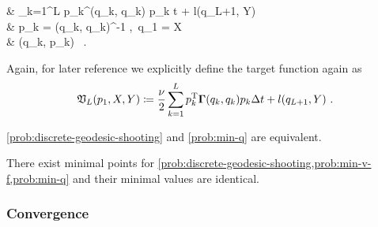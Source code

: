 \begin{problem}
\label{prob:discrete-geodesic-shooting}
	\begin{cases}
		 &  \sum_{k=1}^L p_k^\T \bGamma(q_k, q_k) p_k \Delta t + l(q_{L+1}, Y)\\
		 & p_k = \bGamma(q_k, q_k)^{-1} ,\ q_1 = X \\
		& (q_k, p_k) \ .
	\end{cases}
\end{problem}
Again, for later reference we explicitly define the target function again as
\begin{equation}
	\mathfrak{V}_L(p_1, X, Y) \coloneqq \frac{\nu}{2} \sum_{k=1}^L p_k^{\mathrm{T}} \mathbf{\Gamma}(q_k, q_k) p_k \Delta t + l(q_{L+1}, Y) \ .
\end{equation}

\begin{theorem}
	\label{theo:discrete-shooting-min-q-equivalence}
	\cref{prob:discrete-geodesic-shooting} and \cref{prob:min-q} are equivalent.
\end{theorem}

\begin{theorem}
	\label{theo:discrete-solutions-existence}
	There exist minimal points for \cref{prob:discrete-geodesic-shooting,prob:min-v-f,prob:min-q} and their minimal values are identical.
\end{theorem}


\subsubsection{Convergence}

